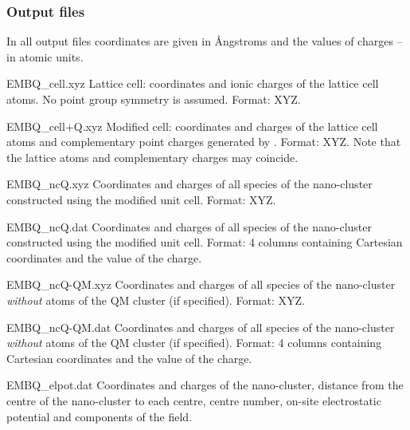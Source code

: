 \subsubsection{Output files}
In all output files coordinates are given in \AA ngstroms and the values of charges -- in atomic units.
\begin{filelist}
\item[EMBQ\_cell.xyz]
Lattice cell: coordinates and ionic charges of the lattice cell atoms. No point group symmetry is assumed. Format: XYZ.
\item[EMBQ\_cell+Q.xyz]
Modified cell: coordinates and charges of the lattice cell atoms and complementary point charges generated by . Format: XYZ. Note that the lattice atoms and complementary charges may coincide.
\item[EMBQ\_ncQ.xyz]
Coordinates and charges of all species of the nano-cluster constructed using the modified unit cell. Format: XYZ.
\item[EMBQ\_ncQ.dat]
Coordinates and charges of all species of the nano-cluster constructed using the modified unit cell. Format: 4 columns containing Cartesian coordinates and the value of the charge.
\item[EMBQ\_ncQ-QM.xyz]
Coordinates and charges of all species of the nano-cluster {\it without} atoms of the QM cluster (if specified). Format: XYZ.
\item[EMBQ\_ncQ-QM.dat]
Coordinates and charges of all species of the nano-cluster {\it without} atoms of the QM cluster (if specified). Format: 4 columns containing Cartesian coordinates and the value of the charge.
\item[EMBQ\_elpot.dat]
Coordinates and charges of the nano-cluster, distance from the centre of the nano-cluster to each centre, centre number, on-site electrostatic potential and components of the field.
\end{filelist}

